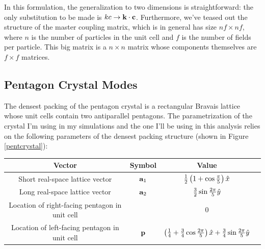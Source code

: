 \documentclass[12pt]{article}
\begin{document}
In this formulation, the generalization to two dimensions is straightforward: 
the only substitution to be made is $kc \rightarrow \mathbf{k}\cdot\mathbf{c}$. Furthermore, we've 
teased out the structure of the master coupling matrix, which is in general has 
size $nf \times nf $, where $n$ is the number of particles in the 
unit cell and $f$ is the number of fields per particle. This big matrix is a 
$n\times n$ matrix whose components themselves are $f\times f$ matrices.


\subsection{Pentagon Crystal Modes}

The densest packing of the pentagon crystal is a rectangular Bravais lattice whose unit cells contain two antiparallel pentagons. The parametrization of the crystal I'm using in my simulations and the one I'll be using in this analysis relies on the following parameters of the densest packing structure (shown in Figure \ref{pentcrystal}):
\begin{center}
\def\arraystretch{1.2}
\begin{tabular}{|c|c|c|c|} \hline
Vector & Symbol & Value\\ \hline
Short real-space lattice vector & $\mathbf{a}_1$ & $\frac{1}{2} \left(1+\cos \frac{\pi}{5}\right)\hat x $\\ \hline
Long real-space lattice vector & $\mathbf{a}_2$ &$ \frac{3}{2} \sin\frac{2\pi}{5} \hat y $\\ \hline
Location of right-facing pentagon in unit cell& & $0$ \\ \hline
Location of left-facing pentagon in unit cell& $\mathbf{p}$ & $\left(\frac{1}{4} + \frac{3}{4} \cos \frac{2\pi}{5} \right) \hat x + \frac{3}{4}\sin\frac{2\pi}{5} \hat y$  \\ \hline
\end{tabular}
\end{center}
\end{document}
